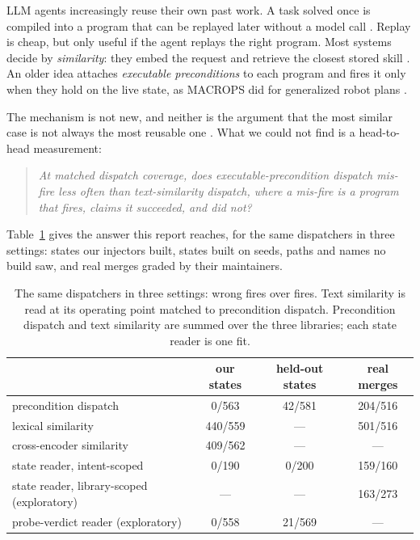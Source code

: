 \documentclass[11pt]{article}
\begin{document}
LLM agents increasingly reuse their own past work. A task solved once is compiled into a program
that can be replayed later without a model call
\cite{fikes1972macrops,cai2024latm,wang2023voyager,chen2026skilldroid,li2026preact,jaber2026auto}.
Replay is cheap, but only useful if the agent replays the right program. Most systems decide by
\emph{similarity}: they embed the request and retrieve the closest stored skill
\cite{wang2023voyager,chen2026skilldroid}. An older idea attaches \emph{executable
preconditions} to each program and fires it only when they hold on the live state, as MACROPS
did for generalized robot plans \cite{fikes1972macrops}.

The mechanism is not new, and neither is the argument that the most similar case is not always
the most reusable one \cite{smyth1998adaptation}. What we could not find is a head-to-head
measurement:

\begin{quote}
\emph{At matched dispatch coverage, does executable-precondition dispatch mis-fire less often
than text-similarity dispatch, where a mis-fire is a program that fires, claims it succeeded, and
did not?}
\end{quote}

Table~\ref{tab:settings} gives the answer this report reaches, for the same dispatchers in three
settings: states our injectors built, states built on seeds, paths and names no build saw, and
real merges graded by their maintainers.

\begin{table}[t]
\centering
\caption{The same dispatchers in three settings: wrong fires over fires. Text similarity is read
at its operating point matched to precondition dispatch. Precondition dispatch and text
similarity are summed over the three libraries; each state reader is one fit.}
\label{tab:settings}
\small
\begin{tabular}{lccc}
\toprule
& our states & held-out states & real merges \\
\midrule
precondition dispatch & 0/563 & 42/581 & 204/516 \\
lexical similarity & 440/559 & --- & 501/516 \\
cross-encoder similarity & 409/562 & --- & --- \\
state reader, intent-scoped & 0/190 & 0/200 & 159/160 \\
state reader, library-scoped (exploratory) & --- & --- & 163/273 \\
probe-verdict reader (exploratory) & 0/558 & 21/569 & --- \\
\bottomrule
\end{tabular}
\end{table}
\end{document}
